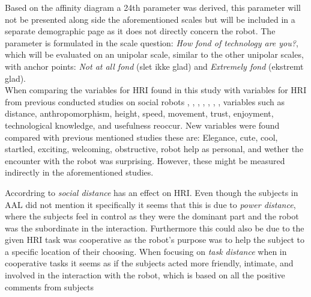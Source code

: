 \noindent
%
Based on the affinity diagram a 24th parameter was derived, this parameter will not be presented along side the aforementioned scales but will be included in a separate demographic page as it does not directly concern the robot. The parameter is formulated in the scale question: \textit{How fond of technology are you?}, which will be evaluated on an unipolar scale, similar to the other unipolar scales, with anchor points: \textit{Not at all fond} (slet ikke glad) and \textit{Extremely fond} (ekstremt glad).\\  

\noindent
When comparing the variables for HRI found in this study with variables for HRI from previous conducted studies on social robots \cite{PDF:ExploringInfluencingVariable}, \cite{PDF:SharingALifeHarvey}, \cite{PDF:InTheCompanyofRobots}, \cite{PDF:CloseButNotStuck}, \cite{PDF:TheImpactOfTraveler}, \cite{PDF:HumanRobotEmodiedInteraction}, \cite{PDF:RecommendationEffects}, variables such as distance, anthropomorphism, height, speed, movement, trust, enjoyment, technological knowledge, and usefulness reoccur. New variables were found compared with previous mentioned studies these are: Elegance, cute, cool, startled, exciting, welcoming, obstructive, robot help as personal, and wether the encounter with the robot was surprising. However, these might be measured indirectly in the aforementioned studies.

Accordring to \cite{PDF:HowSocialDistanceShapesHRI} \textit{social distance} has an effect on HRI. Even though the subjects in AAL did not mention it specifically it seems that this is due to \textit{power distance}, where the subjects feel in control as they were the dominant part and the robot was the subordinate in the interaction. Furthermore this could also be due to the given HRI task was cooperative as the robot's purpose was to help the subject to a specific location of their choosing. When focusing on \textit{task distance} when in cooperative tasks it seems as if the subjects acted more friendly, intimate, and involved in the interaction with the robot, which is based on all the positive comments from subjects 
 
  




